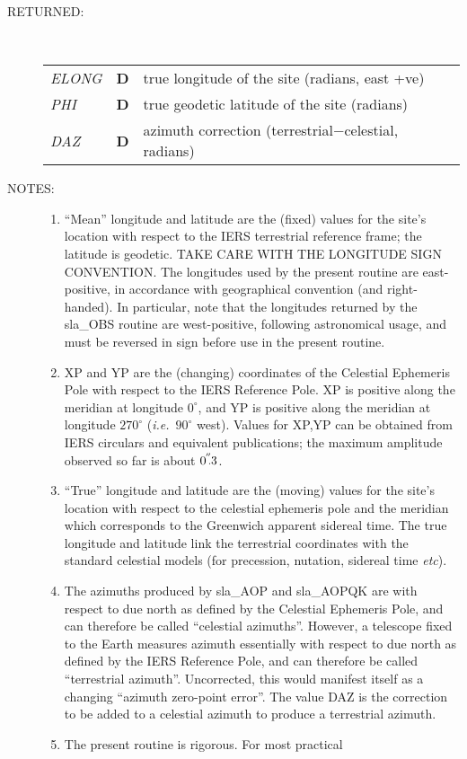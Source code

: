 \documentclass[11pt,twoside]{article}
\newcommand{\arcsec}[2] {\arcseci{#1}$\hspace{-0.4em}.#2$}
\newcommand{\arcsec}[2] {
      {$#1\hspace{-0.05em}^{'\hspace{-0.1em}'}\hspace{-0.4em}.#2$}
   }
\newcommand{\arcseci}[1] {$#1\hspace{-0.05em}$\raisebox{-0.5ex}
                         {$^{'\hspace{-0.1em}'}$}}
\renewcommand{\arcseci}[1] {$#1\hspace{-0.05em}^{'\hspace{-0.1em}'}$}
\newlength{\oldspacing}
\newcommand{\args}[2]
{
  \goodbreak
  \setlength{\oldspacing}{\topsep}
  \setlength{\topsep}{0.3ex}
  \begin{description}
  \item[#1]:\\[1.5ex]
    \begin{tabular}{p{7em}p{6em}p{22em}}
      #2
    \end{tabular}
  \end{description}
  \setlength{\topsep}{\oldspacing}
}
\renewcommand{\args}[2]
   {
     \begin{description}
        \item[#1:]\\
        \begin{tabular}{p{7em}p{6em}l}
           #2
        \end{tabular}
     \end{description}
   }
\newcommand{\spec}[3]
{
  {\em {#1}} & {\bf \mbox{#2}} & {#3}
}
\newcommand{\notes}[1]
{
  \goodbreak
  \setlength{\oldspacing}{\topsep}
  \setlength{\topsep}{0.3ex}
  \begin{description}
    \item[NOTES]:
        #1
  \end{description}
  \setlength{\topsep}{\oldspacing}
}
\renewcommand{\notes}[1]
   {
      \begin{description}
         \item[NOTES:]
            #1
      \end{description}
   }
\begin{document}
\args{RETURNED}
{
 \spec{ELONG}{D}{true longitude of the site (radians, east +ve)} \\
 \spec{PHI}{D}{true geodetic latitude of the site (radians)} \\
 \spec{DAZ}{D}{azimuth correction (terrestrial$-$celestial, radians)}
}
\notes
{
\begin{enumerate}
\item ``Mean'' longitude and latitude are the (fixed) values for the
      site's location with respect to the IERS terrestrial reference
      frame;  the latitude is geodetic.  TAKE CARE WITH THE LONGITUDE
      SIGN CONVENTION.  The longitudes used by the present routine
      are east-positive, in accordance with geographical convention
      (and right-handed).  In particular, note that the longitudes
      returned by the sla\_OBS routine are west-positive, following
      astronomical usage, and must be reversed in sign before use in
      the present routine.
\item XP and YP are the (changing) coordinates of the Celestial
      Ephemeris Pole with respect to the IERS Reference Pole.
      XP is positive along the meridian at longitude $0^\circ$,
      and YP is positive along the meridian at longitude
      $270^\circ$ ({\it i.e.}\ $90^\circ$ west).  Values for XP,YP can
      be obtained from IERS circulars and equivalent publications;
      the maximum amplitude observed so far is about \arcsec{0}{3}.
\item ``True'' longitude and latitude are the (moving) values for
      the site's location with respect to the celestial ephemeris
      pole and the meridian which corresponds to the Greenwich
      apparent sidereal time.  The true longitude and latitude
      link the terrestrial coordinates with the standard celestial
      models (for precession, nutation, sidereal time {\it etc}).
\item The azimuths produced by sla\_AOP and sla\_AOPQK are with
      respect to due north as defined by the Celestial Ephemeris
      Pole, and can therefore be called ``celestial azimuths''.
      However, a telescope fixed to the Earth measures azimuth
      essentially with respect to due north as defined by the
      IERS Reference Pole, and can therefore be called ``terrestrial
      azimuth''.  Uncorrected, this would manifest itself as a
      changing ``azimuth zero-point error''.  The value DAZ is the
      correction to be added to a celestial azimuth to produce
      a terrestrial azimuth.
\item The present routine is rigorous.  For most practical

\end{enumerate}}
\end{document}
